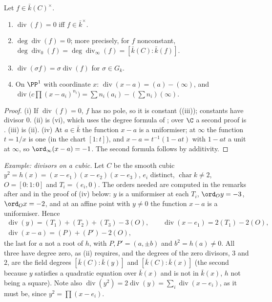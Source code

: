 \begin{proposition}\label{prop:curves:principal}
Let $f\in\bar k(C)^\times$.
\begin{enumerate}[label=(\roman*)]
\item $\operatorname{div}(f)=0$ iff $f\in\bar k^\times$.
\item $\deg\operatorname{div}(f)=0$; more precisely, for $f$ nonconstant, $\deg\operatorname{div}_0(f)=\deg\operatorname{div}_\infty(f)=[\bar k(C):\bar k(f)]$.
\item $\operatorname{div}(\sigma f)=\sigma\operatorname{div}(f)$ for $\sigma\in G_k$.
\item On $\PP^1$ with coordinate $x$: $\operatorname{div}(x-a)=(a)-(\infty)$, and $\operatorname{div}\bigl(c\prod(x-a_i)^{n_i}\bigr)=\sum n_i(a_i)-(\sum n_i)(\infty)$.
\end{enumerate}
\end{proposition}

\begin{proof}
(i) If $\operatorname{div}(f)=0$, $f$ has no pole, so it is constant ((iii)); constants have divisor $0$. (ii) is
(vi), which uses the degree formula of ; over $\C$ a second proof is
. (iii) is (ii). (iv) At $a\in\bar k$ the function $x-a$ is a uniformiser; at $\infty$ the
function $t=1/x$ is one (in the chart $[1:t]$), and $x-a=t^{-1}(1-at)$ with $1-at$ a unit at $\infty$, so $\ord_\infty(x-a)=-1$. The second formula follows
by additivity.
\end{proof}

\emph{Example: divisors on a cubic.}
Let $C$ be the smooth cubic $y^2=h(x)=(x-e_1)(x-e_2)(x-e_3)$, $e_i$ distinct, $\operatorname{char}k\ne2$, $O=[0:1:0]$ and $T_i=(e_i,0)$. The orders
needed are computed in the remarks after  and in the proof of (iv) below: $y$ is a uniformiser at
each $T_i$, $\ord_O y=-3$, $\ord_O x=-2$, and at an affine point with $y\ne0$ the function $x-a$ is a uniformiser. Hence
\begin{gather*}
\operatorname{div}(y)=(T_1)+(T_2)+(T_3)-3(O),\qquad \operatorname{div}(x-e_1)=2(T_1)-2(O),\\
\operatorname{div}(x-a)=(P)+(P')-2(O),
\end{gather*}
the last for $a$ not a root of $h$, with $P,P'=(a,\pm b)$ and $b^2=h(a)\ne0$. All three have degree zero, as (ii) requires, and
the degrees of the zero divisors, $3$ and $2$, are the field degrees $[\bar k(C):\bar k(y)]$ and $[\bar k(C):\bar k(x)]$ (the second because $y$ satisfies a
quadratic equation over $\bar k(x)$ and is not in $\bar k(x)$, $h$ not being a square). Note also $\operatorname{div}(y^2)=2\operatorname{div}(y)=\sum_i\operatorname{div}(x-e_i)$,
as it must be, since $y^2=\prod(x-e_i)$.

